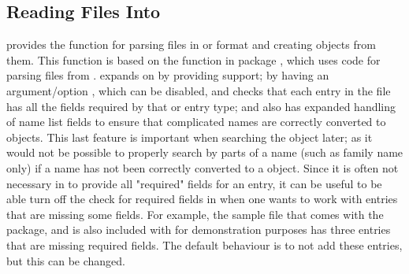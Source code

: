 \documentclass[article]{jss}\usepackage[]{graphicx}\usepackage[]{color}
\newcommand{\ourpkg}{\pkg{RefManageR}}
\begin{document}
\subsection[Reading .bib Files Into R]{Reading  Files Into \R{}} 
\ourpkg{} provides the function  for parsing  files in \Biblatex{} or \Bibtex{} format and creating  objects from them.  This function is based on the  function in package  \citep{Rbibtex}, which uses code for parsing \Bibtex{} files from \citet{bibparser}.   expands on  by providing \Biblatex{} support; by having an argument/option , which can be disabled, and checks that each entry in the file has all the fields required by that \Biblatex{} or \Bibtex{} entry type; and also has expanded handling of name list fields to ensure that complicated names are correctly converted to  objects.  This last feature is important when searching the  object later; as it would not be possible to properly search by parts of a name (such as family name only) if a name has not been correctly converted to a  object.  Since it is often not necessary in \Biblatex{} to provide all "required" fields for an entry, it can be useful to be able turn off the check for required fields in \R{} when one wants to work with entries that are missing some fields.  For example, the sample  file that comes with the \Biblatex{} package, and is also included with \ourpkg{} for demonstration purposes has three entries that are missing required fields.  The default behaviour is to not add these entries, but this can be changed.
\end{document}
